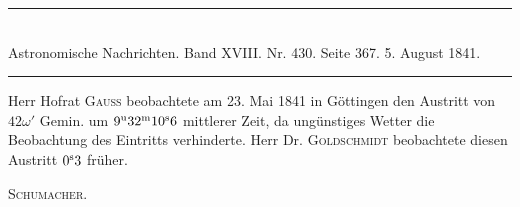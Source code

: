 \clearpage
\hypertarget{native-469-occultation}{}
\begin{center}
\rule{0.55\linewidth}{0.4pt}\\[2pt]
Astronomische Nachrichten. Band XVIII. Nr. 430. Seite 367. 5. August 1841.\\[2pt]
\rule{0.55\linewidth}{0.4pt}
\end{center}

Herr Hofrat \textsc{Gauss} beobachtete am 23. Mai 1841 in Göttingen den Austritt von $42\omega'$ Gemin. um $9^{\rm u}32^{\rm m}10^{\rm s}6$ mittlerer Zeit, da ungünstiges Wetter die Beobachtung des Eintritts verhinderte. Herr Dr. \textsc{Goldschmidt} beobachtete diesen Austritt $0^{\rm s}3$ früher.
\begin{flushright}\textsc{Schumacher.}\end{flushright}

